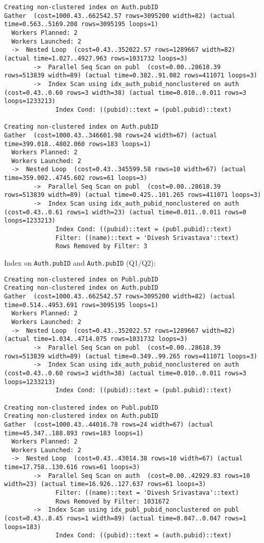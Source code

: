 \documentclass[11pt]{scrartcl}
\begin{document}
{\small
\parskip0pt\begin{verbatim}
Creating non-clustered index on Auth.pubID
Gather  (cost=1000.43..662542.57 rows=3095200 width=82) (actual time=0.563..5169.208 rows=3095195 loops=1)
  Workers Planned: 2
  Workers Launched: 2
  ->  Nested Loop  (cost=0.43..352022.57 rows=1289667 width=82) (actual time=1.027..4927.963 rows=1031732 loops=3)
        ->  Parallel Seq Scan on publ  (cost=0.00..28618.39 rows=513839 width=89) (actual time=0.382..91.082 rows=411071 loops=3)
        ->  Index Scan using idx_auth_pubid_nonclustered on auth  (cost=0.43..0.60 rows=3 width=38) (actual time=0.010..0.011 rows=3 loops=1233213)  
              Index Cond: ((pubid)::text = (publ.pubid)::text)

Creating non-clustered index on Auth.pubID
Gather  (cost=1000.43..346601.98 rows=24 width=67) (actual time=399.018..4802.060 rows=183 loops=1)
  Workers Planned: 2
  Workers Launched: 2
  ->  Nested Loop  (cost=0.43..345599.58 rows=10 width=67) (actual time=359.002..4745.602 rows=61 loops=3)
        ->  Parallel Seq Scan on publ  (cost=0.00..28618.39 rows=513839 width=89) (actual time=0.425..101.265 rows=411071 loops=3)
        ->  Index Scan using idx_auth_pubid_nonclustered on auth  (cost=0.43..0.61 rows=1 width=23) (actual time=0.011..0.011 rows=0 loops=1233213)  
              Index Cond: ((pubid)::text = (publ.pubid)::text)
              Filter: ((name)::text = 'Divesh Srivastava'::text)
              Rows Removed by Filter: 3
\end{verbatim}}

Index on \texttt{Auth.pubID} and \texttt{Auth.pubID} (Q1/Q2):

{\small
\parskip0pt\begin{verbatim}
Creating non-clustered index on Publ.pubID
Creating non-clustered index on Auth.pubID
Gather  (cost=1000.43..662542.57 rows=3095200 width=82) (actual time=0.514..4953.691 rows=3095195 loops=1)
  Workers Planned: 2
  Workers Launched: 2
  ->  Nested Loop  (cost=0.43..352022.57 rows=1289667 width=82) (actual time=1.034..4714.075 rows=1031732 loops=3)
        ->  Parallel Seq Scan on publ  (cost=0.00..28618.39 rows=513839 width=89) (actual time=0.349..99.265 rows=411071 loops=3)
        ->  Index Scan using idx_auth_pubid_nonclustered on auth  (cost=0.43..0.60 rows=3 width=38) (actual time=0.010..0.011 rows=3 loops=1233213)  
              Index Cond: ((pubid)::text = (publ.pubid)::text)

Creating non-clustered index on Publ.pubID
Creating non-clustered index on Auth.pubID
Gather  (cost=1000.43..44016.78 rows=24 width=67) (actual time=45.347..188.893 rows=183 loops=1)
  Workers Planned: 2
  Workers Launched: 2
  ->  Nested Loop  (cost=0.43..43014.38 rows=10 width=67) (actual time=17.758..130.616 rows=61 loops=3)
        ->  Parallel Seq Scan on auth  (cost=0.00..42929.83 rows=10 width=23) (actual time=16.926..127.637 rows=61 loops=3)
              Filter: ((name)::text = 'Divesh Srivastava'::text)
              Rows Removed by Filter: 1031672
        ->  Index Scan using idx_publ_pubid_nonclustered on publ  (cost=0.43..8.45 rows=1 width=89) (actual time=0.047..0.047 rows=1 loops=183)      
              Index Cond: ((pubid)::text = (auth.pubid)::text)
\end{verbatim}}
\end{document}
